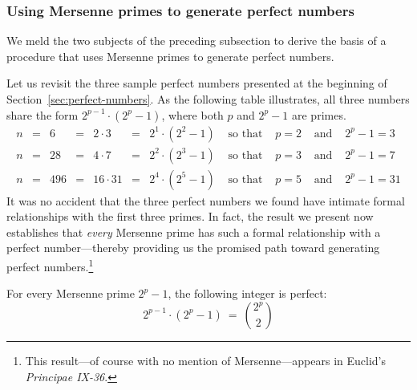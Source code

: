 \subsubsection{Using Mersenne primes to generate perfect numbers}
\label{sec:MP+PN}

We meld the two subjects of the preceding subsection to derive the basis of a procedure that uses Mersenne primes to generate perfect numbers.

\medskip

Let us revisit the three sample perfect numbers presented at the beginning of Section~\ref{sec:perfect-numbers}.  As the following table illustrates, all three numbers share the form $2^{p-1} \cdot (2^p -1)$, where both $p$ and $2^p-1$ are primes.
\[ \begin{array}{ccccccccccc}
n & = & 6   & = & 2 \cdot 3  & = & 2^1 \cdot (2^2 -1) & 
\mbox{ so that } & p = 2 & 
\mbox{ and } & 2^p-1 = 3 \\
n & = & 28  & = & 4 \cdot 7  & = & 2^2 \cdot (2^3 -1) & 
\mbox{ so that } & p = 3 &
\mbox{ and } & 2^p-1 = 7 \\
n & = & 496 & = & 16 \cdot 31 & = & 2^4 \cdot (2^5 -1) & 
\mbox{ so that } & p=5 &
\mbox{ and } & 2^p-1 = 31
\end{array}
\]
It was no accident that the three perfect numbers we found have intimate formal relationships with the first three primes.  In fact, the result we present now establishes that {\em every} Mersenne prime has such a formal relationship with a perfect number---thereby providing us the promised path toward generating perfect numbers.\footnote{This result---of course with no mention of Mersenne---appears in Euclid's \textit{Principae IX-36}.} 

\begin{prop}
\label{thm:MP-PN}
For every Mersenne prime $2^p-1$, the following integer is perfect:
\begin{equation}
\label{eq:Mersenne-perfect-p}
2^{p-1} \cdot (2^p-1) \ = \ {{2^p} \choose 2}
\end{equation} 
\end{prop}

